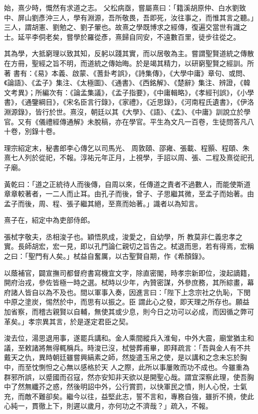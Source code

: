 \begin{pinyinscope}
 始，熹少時，慨然有求道之志。
 父松病亟，嘗屬熹曰：「籍溪胡原仲、白水劉致中、屏山劉彥沖三人，學有淵源，吾所敬畏，吾即死，汝往事之，而惟其言之聽。」三人，謂胡憲、劉勉之、劉子翬也。故熹之學既博求之經傳，復遍交當世有識之士。延平李侗老矣，嘗學於羅從彥，熹歸自同安，不遠數百里，徒步往從之。



 其為學，大抵窮理以致其知，反躬以踐其實，而以居敬為主。嘗謂聖賢道統之傳散在方冊，聖經之旨不明，而道統之傳始晦。於是竭其精力，以研窮聖賢之經訓。所著
 書有：《易》本義、啟蒙、《蓍卦考誤》，《詩集傳》，《大學中庸》章句、或問、《論語》、《孟子》集注、《太極圖》、《通書》、《西銘解》、《楚辭》集注、辨證，《韓文考異》；所編次有：《論孟集議》，《孟子指要》，《中庸輯略》，《孝經刊誤》，《小學書》，《通鑒綱目》，《宋名臣言行錄》，《家禮》，《近思錄》，《河南程氏遺書》，《伊洛淵源錄》，皆行於世。熹沒，朝廷以其《大學》、《語》、《孟》、《中庸》訓說立於學官。又有《儀禮經傳通解》未脫稿，亦在學官。平生為文凡一百卷，生徒問答凡八十卷，別錄十卷。



 理宗紹定末，秘書郎李心傳乞以司馬光、
 周敦頤、邵雍、張載、程顥、程頤、朱熹七人列於從祀，不報。淳祐元年正月，上視學，手詔以周、張、二程及熹從祀孔子廟。



 黃乾曰：「道之正統待人而後傳，自周以來，任傳道之責者不過數人，而能使斯道章章較著者，一二人而止耳。由孔子而後，曾子、子思繼其微，至孟子而始著。由孟子而後，周、程、張子繼其絕，至熹而始著。」識者以為知言。



 熹子在，紹定中為吏部侍郎。



 張栻字敬夫，丞相浚子也。穎悟夙成，浚愛之，自幼學，所
 教莫非仁義忠孝之實。長師胡宏，宏一見，即以孔門論仁親切之旨告之。栻退而思，若有得焉，宏稱之曰：「聖門有人矣。」栻益自奮厲，以古聖賢自期，作《希顏錄》。



 以蔭補官，闢宣撫司都督府書寫機宜文字，除直密閣，時孝宗新即位，浚起謫籍，開府治戎，參佐皆極一時之選。栻時以少年，內贊密謀，外參庶務，其所綜畫，幕府諸人皆自以為不及也。間以軍事入奏，因進言曰：「陛下上念宗社之仇恥，下閔中原之塗炭，惕然於中，而思有以振之。臣
 謂此心之發，即天理之所存也。願益加省察，而稽古親賢以自輔，無使其或少息，則今日之功可以必成，而因循之弊可革矣。」孝宗異其言，於是遂定君臣之契。



 浚去位，湯思退用事，遂罷兵講和。金人乘間縱兵入淮甸，中外大震，廟堂猶主和議，至敕諸將無得輒稱兵。時浚已沒，栻營葬甫畢，即拜疏言：「吾與金人有不共戴天之仇，異時朝廷雖嘗興縞素之師，然旋遣玉帛之使，是以講和之念未忘於胸中，而至忱惻怛之心無以感格於天
 人之際，此所以事屢敗而功不成也。今雖重為群邪所誤，以蹙國而召寇，然亦安知非天欲以是開聖心哉。謂宜深察此理，使吾胸中了然無纖芥之惑，然後明詔中外，公行賞罰，以快軍民之憤，則人心悅，士氣充，而敵不難卻矣。繼今以往，益堅此志，誓不言和，專務自強，雖折不撓，使此心純一，貫徹上下，則遲以歲月，亦何功之不濟哉？」疏入，不報。




\end{pinyinscope}
